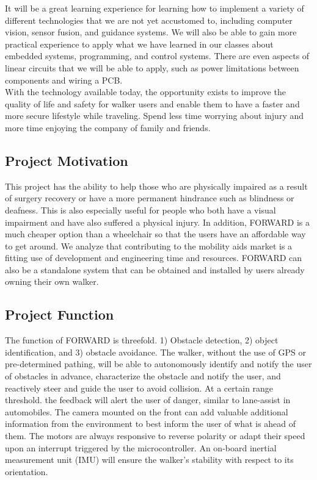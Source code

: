 \noindent It will be a great learning experience for learning how to implement a variety of different technologies that we are not yet accustomed to, including computer vision, sensor fusion, and guidance systems. We will also be able to gain more practical experience to apply what we have learned in our classes about embedded systems, programming, and control systems. There are even aspects of linear circuits that we will be able to apply, such as power limitations between components and wiring a PCB. \\

\noindent With the technology available today, the opportunity exists to improve the quality of life and safety for walker users and enable them to have a faster and more secure lifestyle while traveling. Spend less time worrying about injury and more time enjoying the company of family and friends.

\subsection{Project Motivation}
\indent This project has the ability to help those who are physically impaired as a result of surgery recovery or have a more permanent hindrance such as blindness or deafness. This is also especially useful for people who both have a visual impairment and have also suffered a physical injury. In addition, FORWARD is a much cheaper option than a wheelchair so that the users have an affordable way to get around. We analyze that contributing to the mobility aids market is a fitting use of development and engineering time and resources. FORWARD can also be a standalone system that can be obtained and installed by users already owning their own walker.

\subsection{Project Function}
\indent The function of FORWARD is threefold. 1) Obstacle detection, 2) object identification, and 3) obstacle avoidance. The walker, without the use of GPS or pre-determined pathing, will be able to autonomously identify and notify the user of obstacles in advance, characterize the obstacle and notify the user, and reactively steer and guide the user to avoid collision. At a certain range threshold. the feedback will alert the user of danger, similar to lane-assist in automobiles. The camera mounted on the front can add valuable additional information from the environment to best inform the user of what is ahead of them. The motors are always responsive to reverse polarity or adapt their speed upon an interrupt triggered by the microcontroller. An on-board inertial measurement unit (IMU) will ensure the walker’s stability with respect to its orientation.\\

